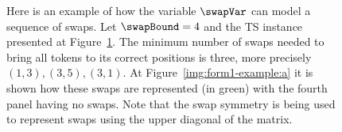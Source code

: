 \begin{figure}[H]
\begin{subfigure}{1\textwidth}
\begin{tikzpicture}[node distance=2cm, 
        outer/.style={circle,draw,inner sep=1pt, minimum size=5mm}, 
        decoration={
            markings,
            mark=at position 0.5 with {\arrow{>}}}
    ]
    \end{tikzpicture}
    \caption{}
    \label{img:form1-example:b}
    \end{subfigure}
    \caption{Here is an example of how the variable $\swapVar$ can model a sequence of swaps. Let $\swapBound 
    = 4$ and the TS instance presented at Figure~\ref{img:form1-example:b}. The minimum number of swaps needed 
    to bring all tokens to its correct positions is three, more precisely $(1,3), (3,5), (3,1)$. 
    At Figure~\ref{img:form1-example:a} it is shown how these swaps are represented (in green) with the fourth 
    panel having no swaps. 
    Note that the swap symmetry is being used to represent swaps using the upper diagonal of the matrix.}
    \label{img:form1-example}
\end{figure}
